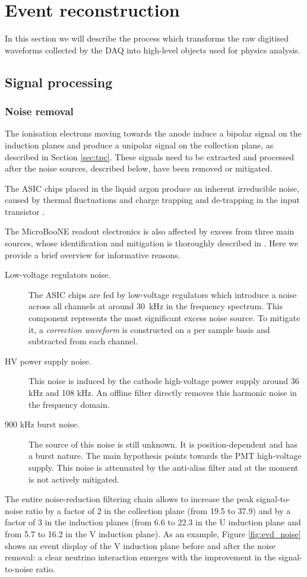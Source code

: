 \chapter{Event reconstruction}\label{sec:eventreco}

\minitoc

In this section we will describe the process which transforms the raw digitised waveforms collected by the DAQ into high-level objects used for physics analysis. 

\section{Signal processing}
\subsection{Noise removal}
The ionisation electrons moving towards the anode induce a bipolar signal on the induction planes and produce a unipolar signal on the collection plane, as described in Section \ref{sec:tpc}. These signals need to be extracted and processed after the noise sources, described below, have been removed or mitigated.

The ASIC chips placed in the liquid argon produce an inherent irreducible noise, caused by thermal fluctuations and charge trapping and de-trapping in the input transistor \cite{Acciarri:2017sde}. 

The MicroBooNE readout electronics is also affected by excess from three main sources, whose identification and mitigation is thoroughly described in \cite{Acciarri:2017sde}. Here we provide a brief overview for informative reasons.
\begin{description}
\item[Low-voltage regulators noise.] The ASIC chips are fed by low-voltage regulators which introduce a noise across all channels at around 30~kHz in the frequency spectrum. This component represents the most significant excess noise source. To mitigate it, a \emph{correction waveform} is constructed on a per sample basis and subtracted from each channel.
\item[HV power supply noise.] This noise is induced by the cathode high-voltage power supply around 36 kHz and 108 kHz. An offline filter directly removes this harmonic noise in the frequency domain.
\item[900 kHz burst noise.] The source of this noise is still unknown. It is position-dependent and has a burst nature. The main hypothesis points towards the PMT high-voltage supply. This noise is attenuated by the anti-alias filter and at the moment is not actively mitigated.
\end{description}
The entire noise-reduction filtering chain allows to increase the peak signal-to-noise ratio by a factor of 2 in the collection plane (from 19.5 to 37.9) and by a factor of 3 in the induction planes (from 6.6 to 22.3 in the U induction plane and from 5.7 to 16.2 in the V induction plane). As an example, Figure \ref{fig:evd_noise} shows an event display of the V induction plane before and after the noise removal: a clear neutrino interaction emerges with the improvement in the signal-to-noise ratio. 

